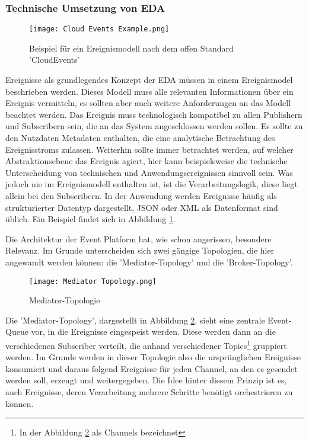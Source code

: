 \subsubsection*{Technische Umsetzung von \ac{EDA}}
\label{teda}
\begin{figure}[H]
  \centering
  \texttt{[image: Cloud Events Example.png]}
  \caption[Beispiel für ein Ereignismodell]{Beispiel für ein Ereignismodell nach dem offen Standard 'CloudEvents' \footnotemark}
  \label{cloudeventslabel}
\end{figure}
Ereignisse als grundlegendes Konzept der \ac{EDA} müssen in einem Ereignismodel beschrieben werden. Dieses Modell muss alle relevanten Informationen über ein Ereignis vermitteln, es sollten aber auch weitere Anforderungen an das Modell beachtet werden. Das Ereignis muss technologisch kompatibel zu allen Publishern und Subscribern sein, die an das System angeschlossen werden sollen. Es sollte zu den Nutzdaten Metadaten enthalten, die eine analytische Betrachtung des Ereignisstroms zulassen. Weiterhin sollte immer betrachtet werden, auf welcher Abstraktionsebene das Ereignis agiert, hier kann beispielsweise die technische Unterscheidung von technischen und Anwendungsereignissen sinnvoll sein. Was jedoch nie im Ereignismodell enthalten ist, ist die Verarbeitungslogik, diese liegt allein bei den Subscribern. \cite[Vgl. ][S. 95]{EDA2010} In der Anwendung werden Ereignisse häufig als strukturierter Datentyp dargestellt, JSON oder XML als Datenformat sind üblich. Ein Beispiel findet sich in Abbildung \ref{cloudeventslabel}.

Die Architektur der Event Platform hat, wie schon angerissen, besondere Relevanz. Im Grunde unterscheiden sich zwei gängige Topologien, die hier angewandt werden können: die 'Mediator-Topology' und die 'Broker-Topology'. 
\begin{figure}[H]
  \centering
  \texttt{[image: Mediator Topology.png]}
  \caption[Mediator-Topologie]{Mediator-Topologie \footnotemark}
  \label{mediatortop}
\end{figure}
Die 'Mediator-Topology', dargestellt in Abbildung \ref{mediatortop}, sieht eine zentrale Event-Queue vor, in die Ereignisse eingespeist werden. Diese werden dann an die verschiedenen Subscriber verteilt, die anhand verschiedener Topics\footnote{In der Abbildung \ref{mediatortop} als Channels bezeichnet} gruppiert werden. Im Grunde werden in dieser Topologie also die ursprünglichen Ereignisse konsumiert und daraus folgend Ereignisse für jeden Channel, an den es gesendet werden soll, erzeugt und weitergegeben. Die Idee hinter diesem Prinzip ist es, auch Ereignisse, deren Verarbeitung mehrere Schritte benötigt orchestrieren zu können. \cite[Vgl. ][]{wickramarachchi_2017_event} \\

